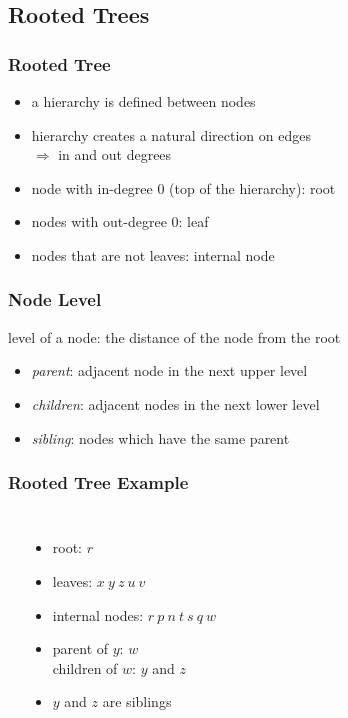 \documentclass[dvipsnames]{beamer}
\begin{document}
\subsection{Rooted Trees}

\begin{frame}
  \frametitle{Rooted Tree}

  \begin{itemize}
    \item a hierarchy is defined between nodes
    \item hierarchy creates a natural direction on edges\\
      $\Rightarrow$ in and out degrees

    \pause
    \medskip
    \item node with in-degree 0 (top of the hierarchy): \alert{root}
    \item nodes with out-degree 0: \alert{leaf}
    \item nodes that are not leaves: \alert{internal node}
  \end{itemize}
\end{frame}

\begin{frame}
  \frametitle{Node Level}

  \begin{definition}
    \alert{level} of a node: the distance of the node from the root
  \end{definition}

  \begin{itemize}
    \item \emph{parent}: adjacent node in the next upper level
    \item \emph{children}: adjacent nodes in the next lower level
    \item \emph{sibling}: nodes which have the same parent
  \end{itemize}
\end{frame}

\begin{frame}
  \frametitle{Rooted Tree Example}

  \begin{example}
    \begin{columns}
      \begin{center}
      \end{center}

      \begin{itemize}
        \item root: $r$
        \item leaves: $x ~ y ~ z ~ u ~ v$
        \item internal nodes: $r ~ p ~ n ~ t ~ s ~ q ~ w$
        \item parent of $y$: $w$\\
          children of $w$: $y$ and $z$\\
	\item $y$ and $z$ are siblings
      \end{itemize}
    \end{columns}
  \end{example}
\end{frame}
\end{document}
